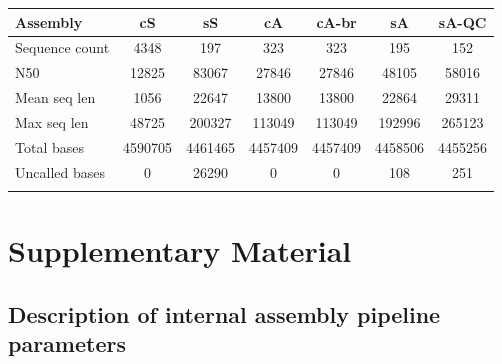 \documentclass{bioinfo}
\begin{document}

\begin{table}[!t]
{\begin{tabular}{l|cccccc}\toprule
Assembly        & cS      & sS      & cA      & cA-br   & sA      & sA-QC   \\\midrule
Sequence count  & 4348    & 197     & 323     & 323     & 195     & 152     \\
N50             & 12825   & 83067   & 27846   & 27846   & 48105   & 58016   \\
Mean seq len    & 1056    & 22647   & 13800   & 13800   & 22864   & 29311   \\
Max seq len     & 48725   & 200327  & 113049  & 113049  & 192996  & 265123  \\
Total bases     & 4590705 & 4461465 & 4457409 & 4457409 & 4458506 & 4455256 \\
Uncalled bases  & 0       & 26290   & 0       & 0       & 108     & 251     \\
\botrule \\
\end{tabular}}{}
\end{table}

\section{Supplementary Material}
\subsection{Description of internal assembly pipeline parameters}
\end{document}
